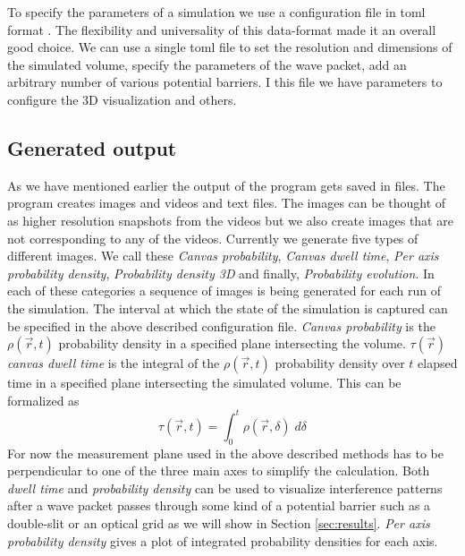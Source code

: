 To specify the parameters of a simulation we use a configuration file in \acrfull{toml} format \cite{toml}.
The flexibility and universality of this data-format made it an overall good choice.
We can use a single \acrshort{toml} file to set the resolution and dimensions of the simulated volume, specify the parameters of the wave packet, add an arbitrary number of various potential barriers.
I this file we have parameters to configure the 3D visualization and others.

\subsection{Generated output}

As we have mentioned earlier the output of the program gets saved in files.
The program creates images and videos and text files.
The images can be thought of as higher resolution snapshots from the videos but we also create images that are not corresponding to any of the videos.
Currently we generate five types of different images.
We call these \textit{Canvas probability}, \textit{Canvas dwell time}, \textit{Per axis probability density}, \textit{Probability density 3D} and finally, \textit{Probability evolution}.
In each of these categories a sequence of images is being generated for each run of the simulation.
The interval at which the state of the simulation is captured can be specified in the above described configuration file.
\textit{Canvas probability} is the $\rho(\vec{r}, t)$ probability density in a specified plane intersecting the volume.
$\tau (\vec{r})$ \textit{canvas dwell time} is the integral of the $\rho(\vec{r}, t)$ probability density over $t$ elapsed time in a specified plane intersecting the simulated volume.
This can be formalized as
\begin{equation}
	\tau (\vec{r}, t) = \int_0^t \rho(\vec{r}, \delta)\; d\delta
	\label{eq:dwell_time}
\end{equation}
For now the measurement plane used in the above described methods has to be perpendicular to one of the three main axes to simplify the calculation.
Both \textit{dwell time} and \textit{probability density} can be used to visualize interference patterns after a wave packet passes through some kind of a potential barrier such as a double-slit or an optical grid as we will show in Section \ref{sec:results}.
\textit{Per axis probability density} gives a plot of integrated probability densities for each axis.
